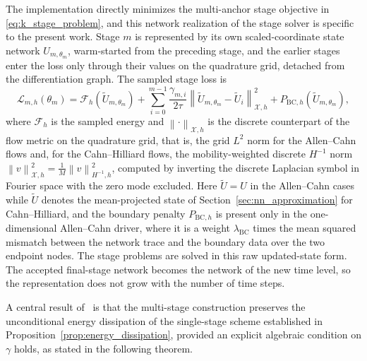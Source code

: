 \documentclass[11pt,letterpaper]{article}
\theoremstyle{plain}
\theoremstyle{definition}
\newcommand{\norm}[1]{\left\| #1 \right\|}
\newcommand{\E}{\mathcal{F}}
\newcommand{\X}{\mathcal{X}}
\begin{document}
The implementation directly minimizes the multi-anchor stage objective in \eqref{eq:k_stage_problem}, and this network realization of the stage solver is specific to the present work. Stage $m$ is represented by its own scaled-coordinate state network $U_{m,\theta_m}$, warm-started from the preceding stage, and the earlier stages enter the loss only through their values on the quadrature grid, detached from the differentiation graph. The sampled stage loss is
\begin{equation}
\mathcal{L}_{m,h}(\theta_m)
=
\E_h(\widetilde U_{m,\theta_m})
+
\sum_{i=0}^{m-1}
\frac{\gamma_{m,i}}{2\tau}
\norm{\widetilde U_{m,\theta_m}-\widetilde U_i}_{\X,h}^{2}
+
P_{\mathrm{BC},h}(\widetilde U_{m,\theta_m}),
\label{eq:network-stage-loss}
\end{equation}
where $\E_h$ is the sampled energy and $\norm{\cdot}_{\X,h}$ is the discrete counterpart of the flow metric on the quadrature grid, that is, the grid $L^2$ norm for the Allen--Cahn flows and, for the Cahn--Hilliard flows, the mobility-weighted discrete $H^{-1}$ norm $\norm{v}_{\X,h}^2=\frac{1}{M}\norm{v}_{H^{-1},h}^2$, computed by inverting the discrete Laplacian symbol in Fourier space with the zero mode excluded. Here $\widetilde U=U$ in the Allen--Cahn cases while $\widetilde U$ denotes the mean-projected state of Section~\ref{sec:nn_approximation} for Cahn--Hilliard, and the boundary penalty $P_{\mathrm{BC},h}$ is present only in the one-dimensional Allen--Cahn driver, where it is a weight $\lambda_{\mathrm{BC}}$ times the mean squared mismatch between the network trace and the boundary data over the two endpoint nodes. The stage problems are solved in this raw updated-state form. The accepted final-stage network becomes the network of the new time level, so the representation does not grow with the number of time steps.

A central result of~\cite{Zaitzeff2020} is that the multi-stage construction preserves the unconditional energy dissipation of the single-stage scheme established in Proposition~\ref{prop:energy_dissipation}, provided an explicit algebraic condition on $\gamma$ holds, as stated in the following theorem.
\end{document}
